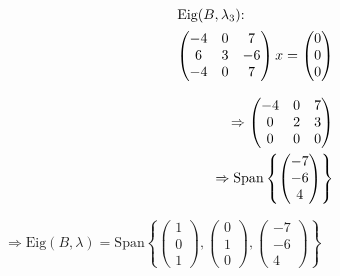 \documentclass{HM}
\newcommand{\Eig}{\text{Eig}}
\newcommand{\Span}{\text{Span}}
\begin{document}
\begin{enumerate}
		\begin{minipage}{.5\textwidth}
			\begin{align*}
			\intertext{$\Eig(B, \lambda_3)$:}
			\begin{pmatrix}
				-4&0&7\\
				6&3&-6\\
				-4&0&7
			\end{pmatrix}x=\begin{pmatrix}
				0\\0\\0
			\end{pmatrix}\\
			\intertext{}
			\Rightarrow\begin{pmatrix}
				-4&0&7\\
				0&2&3\\
				0&0&0
			\end{pmatrix}\\
			\Rightarrow\Span\left\lbrace\begin{pmatrix}
				-7\\
				-6\\
				4
			\end{pmatrix}\right\rbrace
			\end{align*}
		\end{minipage}
		$\Rightarrow \Eig(B,\lambda)=\Span\left\lbrace\begin{pmatrix}
			1\\0\\1
		\end{pmatrix},\begin{pmatrix}
			0\\1\\0
		\end{pmatrix},\begin{pmatrix}
			-7\\-6\\4
		\end{pmatrix}\right\rbrace$
	\end{enumerate}
\end{document}
